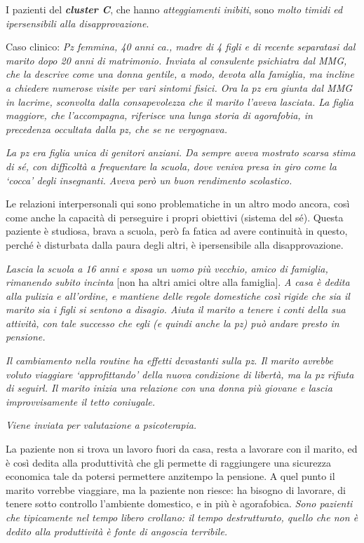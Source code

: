 \documentclass[]{article}
\begin{document}
I pazienti del \textbf{\emph{cluster C}}, che hanno \emph{atteggiamenti
inibiti}, sono \emph{molto timidi ed ipersensibili alla
disapprovazione}.

Caso clinico: \emph{Pz femmina, 40 anni ca., madre di 4 figli e di
recente separatasi dal marito dopo 20 anni di matrimonio. Inviata al
consulente psichiatra dal MMG, che la descrive come una donna gentile, a
modo, devota alla famiglia, ma incline a chiedere numerose visite per
vari sintomi fisici. Ora la pz era giunta dal MMG in lacrime, sconvolta
dalla consapevolezza che il marito l'aveva lasciata. La figlia maggiore,
che l'accompagna, riferisce una lunga storia di agorafobia, in
precedenza occultata dalla pz, che se ne vergognava.}

\emph{La pz era figlia unica di genitori anziani. Da sempre aveva
mostrato scarsa stima di sé, con difficoltà a frequentare la scuola,
dove veniva presa in giro come la `cocca' degli insegnanti. Aveva però
un buon rendimento scolastico.}

Le relazioni interpersonali qui sono problematiche in un altro modo
ancora, così come anche la capacità di perseguire i propri obiettivi
(sistema del sé). Questa paziente è studiosa, brava a scuola, però fa
fatica ad avere continuità in questo, perché è disturbata dalla paura
degli altri, è ipersensibile alla disapprovazione.

\emph{Lascia la scuola a 16 anni e sposa un uomo più vecchio, amico di
famiglia, rimanendo subito incinta} {[}non ha altri amici oltre alla
famiglia{]}. \emph{A casa è dedita alla pulizia e all'ordine, e mantiene
delle regole domestiche così rigide che sia il marito sia i figli si
sentono a disagio. Aiuta il marito a tenere i conti della sua attività,
con tale successo che egli (e quindi anche la pz) può andare presto in
pensione. }

\emph{Il cambiamento nella routine ha effetti devastanti sulla pz. Il
marito avrebbe voluto viaggiare `approfittando' della nuova condizione
di libertà, ma la pz rifiuta di seguirl. Il marito inizia una relazione
con una donna più giovane e lascia improvvisamente il tetto coniugale.}

\emph{Viene inviata per valutazione a psicoterapia.}

La paziente non si trova un lavoro fuori da casa, resta a lavorare con
il marito, ed è così dedita alla produttività che gli permette di
raggiungere una sicurezza economica tale da potersi permettere anzitempo
la pensione. A quel punto il marito vorrebbe viaggiare, ma la paziente
non riesce: ha bisogno di lavorare, di tenere sotto controllo l'ambiente
domestico, e in più è agorafobica. \emph{Sono pazienti che tipicamente
nel tempo libero crollano: il tempo destrutturato, quello che non è
dedito alla produttività è fonte di angoscia terribile. }
\end{document}
